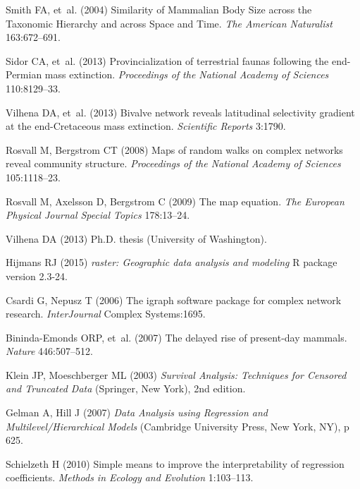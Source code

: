 \documentclass{pnastwo}
\begin{document}
\begin{article}
\begin{thebibliography}{10}
Smith FA, {et~al.}
\newblock (2004) {Similarity of Mammalian Body Size across the Taxonomic
  Hierarchy and across Space and Time}.
\newblock \emph{The American Naturalist} 163:672--691.

Sidor CA, {et~al.}
\newblock (2013) {Provincialization of terrestrial faunas following the
  end-Permian mass extinction.}
\newblock \emph{Proceedings of the National Academy of Sciences} 110:8129--33.

Vilhena DA, {et~al.}
\newblock (2013) {Bivalve network reveals latitudinal selectivity gradient at
  the end-Cretaceous mass extinction.}
\newblock \emph{Scientific Reports} 3:1790.

Rosvall M, Bergstrom CT
\newblock (2008) {Maps of random walks on complex networks reveal community
  structure.}
\newblock \emph{Proceedings of the National Academy of Sciences} 105:1118--23.

Rosvall M, Axelsson D, Bergstrom C
\newblock (2009) {The map equation}.
\newblock \emph{The European Physical Journal Special Topics} 178:13--24.

Vilhena DA
\newblock (2013) Ph.D. thesis (University of Washington).

Hijmans RJ
\newblock (2015) \emph{raster: Geographic data analysis and modeling}
\newblock R package version 2.3-24.

Csardi G, Nepusz T
\newblock (2006) The igraph software package for complex network research.
\newblock \emph{InterJournal} Complex Systems:1695.

Bininda-Emonds ORP, {et~al.}
\newblock (2007) {The delayed rise of present-day mammals}.
\newblock \emph{Nature} 446:507--512.

Klein JP, Moeschberger ML
\newblock (2003) \emph{{Survival Analysis: Techniques for Censored and
  Truncated Data}}
\newblock (Springer, New York), 2nd edition.

Gelman A, Hill J
\newblock (2007) \emph{{Data Analysis using Regression and
  Multilevel/Hierarchical Models}}
\newblock (Cambridge University Press, New York, NY), p 625.

Schielzeth H
\newblock (2010) {Simple means to improve the interpretability of regression
  coefficients}.
\newblock \emph{Methods in Ecology and Evolution} 1:103--113.


\end{thebibliography}
\end{article}
\end{document}

